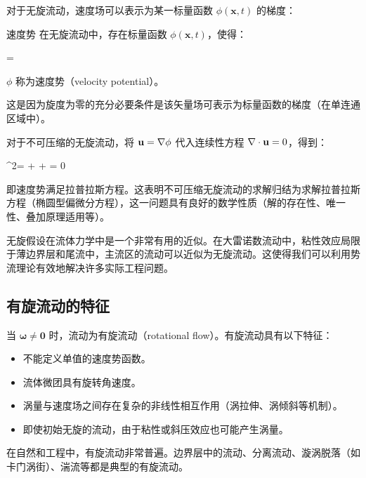 对于无旋流动，速度场可以表示为某一标量函数 \(\phi(\mathbf{x},t)\) 的梯度：

\begin{myTheorem}{速度势}
在无旋流动中，存在标量函数 \(\phi(\mathbf{x},t)\)，使得：
\begin{myformula}
 = \Nabla\phi
\end{myformula}
\(\phi\) 称为速度势（velocity potential）。
\end{myTheorem}

这是因为旋度为零的充分必要条件是该矢量场可表示为标量函数的梯度（在单连通区域中）。

对于不可压缩的无旋流动，将 \(\mathbf{u} = \nabla\phi\) 代入连续性方程 \(\nabla\cdot\mathbf{u} = 0\)，得到：

\begin{myformula}
\Nabla^2\phi =  +  +  = 0
\end{myformula}

即速度势满足拉普拉斯方程。这表明不可压缩无旋流动的求解归结为求解拉普拉斯方程（椭圆型偏微分方程），这一问题具有良好的数学性质（解的存在性、唯一性、叠加原理适用等）。

\begin{remark}
无旋假设在流体力学中是一个非常有用的近似。在大雷诺数流动中，粘性效应局限于薄边界层和尾流中，主流区的流动可以近似为无旋流动。这使得我们可以利用势流理论有效地解决许多实际工程问题。
\end{remark}

\subsection{有旋流动的特征}

当 \(\boldsymbol{\omega} \neq \mathbf{0}\) 时，流动为有旋流动（rotational flow）。有旋流动具有以下特征：

\begin{itemize}
    \item 不能定义单值的速度势函数。
    \item 流体微团具有旋转角速度。
    \item 涡量与速度场之间存在复杂的非线性相互作用（涡拉伸、涡倾斜等机制）。
    \item 即使初始无旋的流动，由于粘性或斜压效应也可能产生涡量。
\end{itemize}

在自然和工程中，有旋流动非常普遍。边界层中的流动、分离流动、漩涡脱落（如卡门涡街）、湍流等都是典型的有旋流动。


